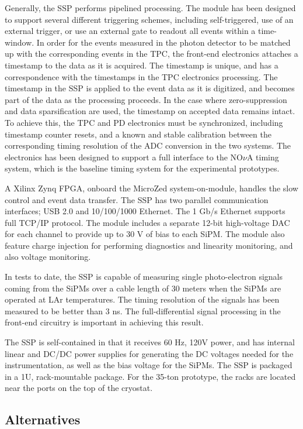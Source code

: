 Generally, the SSP performs pipelined processing.  The module has been
designed to support several different triggering schemes, including
self-triggered, use of an external trigger, or use an external gate to
readout all events within a time-window.  In order for the events
measured in the photon detector to be matched up with the
corresponding events in the TPC, the front-end electronics attaches a
timestamp to the data as it is acquired.  The timestamp is unique, and
has a correspondence with the timestamps in the TPC electronics
processing.  The timestamp in the SSP is applied to the event data as
it is digitized, and becomes part of the data as the processing
proceeds.  In the case where zero-suppression and data sparsification
are used, the timestamp on accepted data remains intact.  To achieve
this, the TPC and PD electronics must be synchronized, including
timestamp counter resets, and a known and stable calibration between
the corresponding timing resolution of the ADC conversion in the two
systems.  The electronics has been designed to support a full
interface to the NO$\nu$A timing system, which is the baseline timing
system for the experimental prototypes.

A Xilinx Zynq FPGA, onboard the MicroZed system-on-module, handles the
slow control and event data transfer.  The SSP has two parallel
communication interfaces; USB 2.0 and 10/100/1000 Ethernet.  The 1
Gb/s Ethernet supports full TCP/IP protocol.  The module includes a
separate 12-bit high-voltage DAC for each channel to provide up to 30
V of bias to each SiPM.  The module also feature charge injection for
performing diagnostics and linearity monitoring, and also voltage
monitoring.

In tests to date, the SSP is capable of measuring single
photo-electron signals coming from the SiPMs over a cable length of 30
meters when the SiPMs are operated at LAr temperatures.  The timing
resolution of the signals has been measured to be better than 3 ns.
The full-differential signal processing in the front-end circuitry is
important in achieving this result.
 
The SSP is self-contained in that it receives 60 Hz, 120V power, and
has internal linear and DC/DC power supplies for generating the DC
voltages needed for the instrumentation, as well as the bias voltage
for the SiPMs.  The SSP is packaged in a 1U, rack-mountable
package. For the 35-ton prototype, the racks are located near the
ports on the top of the cryostat.

\subsection{Alternatives}
\label{sec_alt}

